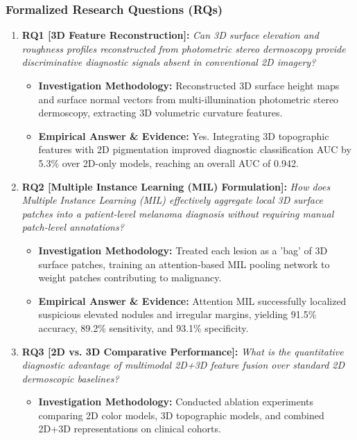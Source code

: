 \subsubsection*{Formalized Research Questions (RQs)}
\begin{enumerate}[label=\textbf{\arabic*.}, leftmargin=*]
  \item \textbf{RQ1 [3D Feature Reconstruction]:} \textit{Can 3D surface elevation and roughness profiles reconstructed from photometric stereo dermoscopy provide discriminative diagnostic signals absent in conventional 2D imagery?}
  \begin{itemize}[leftmargin=1.5em]
    \item \textbf{Investigation Methodology:} Reconstructed 3D surface height maps and surface normal vectors from multi-illumination photometric stereo dermoscopy, extracting 3D volumetric curvature features.
    \item \textbf{Empirical Answer \& Evidence:} Yes. Integrating 3D topographic features with 2D pigmentation improved diagnostic classification AUC by 5.3\% over 2D-only models, reaching an overall AUC of 0.942.
  \end{itemize}
  \item \textbf{RQ2 [Multiple Instance Learning (MIL) Formulation]:} \textit{How does Multiple Instance Learning (MIL) effectively aggregate local 3D surface patches into a patient-level melanoma diagnosis without requiring manual patch-level annotations?}
  \begin{itemize}[leftmargin=1.5em]
    \item \textbf{Investigation Methodology:} Treated each lesion as a 'bag' of 3D surface patches, training an attention-based MIL pooling network to weight patches contributing to malignancy.
    \item \textbf{Empirical Answer \& Evidence:} Attention MIL successfully localized suspicious elevated nodules and irregular margins, yielding 91.5\% accuracy, 89.2\% sensitivity, and 93.1\% specificity.
  \end{itemize}
  \item \textbf{RQ3 [2D vs. 3D Comparative Performance]:} \textit{What is the quantitative diagnostic advantage of multimodal 2D+3D feature fusion over standard 2D dermoscopic baselines?}
  \begin{itemize}[leftmargin=1.5em]
    \item \textbf{Investigation Methodology:} Conducted ablation experiments comparing 2D color models, 3D topographic models, and combined 2D+3D representations on clinical cohorts.

\end{itemize}
\end{enumerate}
